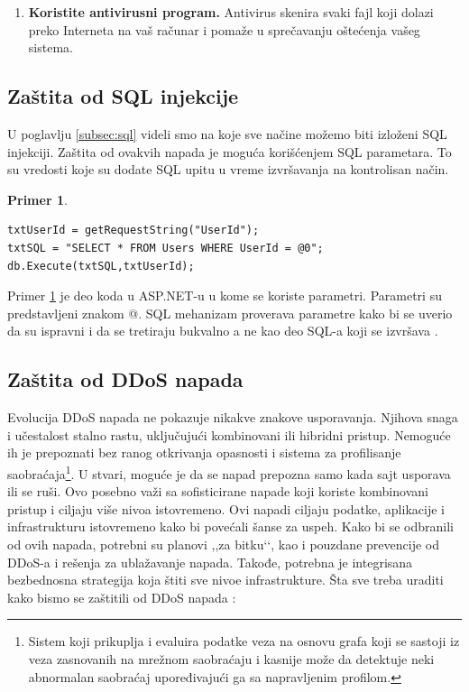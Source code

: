 \documentclass[a4paper]{article}
\theoremstyle{break}
\newtheorem{primer}{Primer}[subsection]
\begin{document}
{\begin{enumerate}
\item \textbf{Koristite antivirusni program.} Antivirus skenira svaki fajl koji dolazi preko Interneta na vaš računar i pomaže u sprečavanju oštećenja vašeg sistema.

\end{enumerate}

\subsection{Zaštita od SQL injekcije}
\label{subsec:zastita_od_sql_injekcije}

U poglavlju \ref{subsec:sql} videli smo na koje sve načine možemo biti izloženi SQL injekciji. Zaštita od ovakvih napada je moguća korišćenjem SQL parametara. To su vredosti koje su dodate SQL upitu u vreme izvršavanja na kontrolisan način.

\begin{primer}
\label{primer_3}
\begin{lstlisting}[frame=single]
txtUserId = getRequestString("UserId");
txtSQL = "SELECT * FROM Users WHERE UserId = @0";
db.Execute(txtSQL,txtUserId);
\end{lstlisting}
\end{primer}
\noindent Primer \ref{primer_3} je deo koda u ASP.NET-u u kome se koriste parametri. Parametri su predstavljeni znakom @. SQL mehanizam proverava parametre kako bi se uverio da su ispravni i da se tretiraju bukvalno a ne kao deo SQL-a koji se izvršava \cite{sql_injection}.

\subsection{Zaštita od DDoS napada}
\label{subsec:zastita_od_ddosa}

Evolucija DDoS napada ne pokazuje nikakve znakove usporavanja. Njihova snaga i učestalost stalno rastu, uključujući kombinovani ili hibridni pristup. Nemoguće ih je prepoznati bez ranog otkrivanja opasnosti i sistema za profilisanje saobraćaja\footnote{Sistem koji prikuplja i evaluira podatke veza na osnovu grafa koji se sastoji iz veza zasnovanih na mrežnom saobraćaju i kasnije može da detektuje neki abnormalan saobraćaj upoređivajući ga sa napravljenim profilom.}. U stvari, moguće je da se napad prepozna samo kada  sajt usporava ili se ruši. Ovo posebno važi sa sofisticirane napade koji koriste kombinovani pristup i ciljaju više nivoa istovremeno. Ovi napadi ciljaju podatke, aplikacije i infrastrukturu istovremeno kako bi povećali šanse za uspeh. Kako bi se odbranili od ovih napada, potrebni su planovi ,,za bitku‘‘, kao i pouzdane prevencije od DDoS-a i rešenja za ublažavanje napada. Takođe, potrebna je integrisana bezbednosna strategija koja štiti sve nivoe infrastrukture. Šta sve treba uraditi kako bismo se zaštitili od DDoS napada \cite{ddos_protect}:

}
\end{document}
